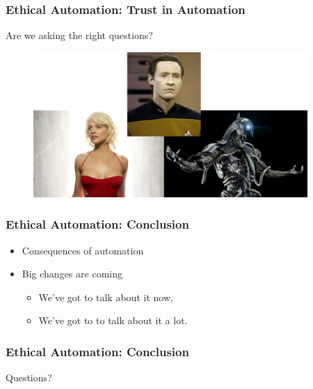 \begin{frame}
	\frametitle{ Ethical Automation: Trust in Automation}
	{\Large Are we asking the right questions?}
	\begin{figure}[bht]
		\centering
		\includegraphics[width=4.1in]{diagrams/AIs}
		\caption{}
		\label{fig:-deg}
	\end{figure}
\end{frame}

\begin{frame}
	\frametitle{ Ethical Automation: Conclusion}
	\begin{itemize}
		\item Consequences of automation
		\item Big changes are coming
		\begin{itemize}
			\item We've got to talk about it now,
			\item We've got to to talk about it a lot.
		\end{itemize}
	\end{itemize}
\end{frame}


\begin{frame}
	\frametitle{ Ethical Automation: Conclusion}
	\Large Questions?
\end{frame}

